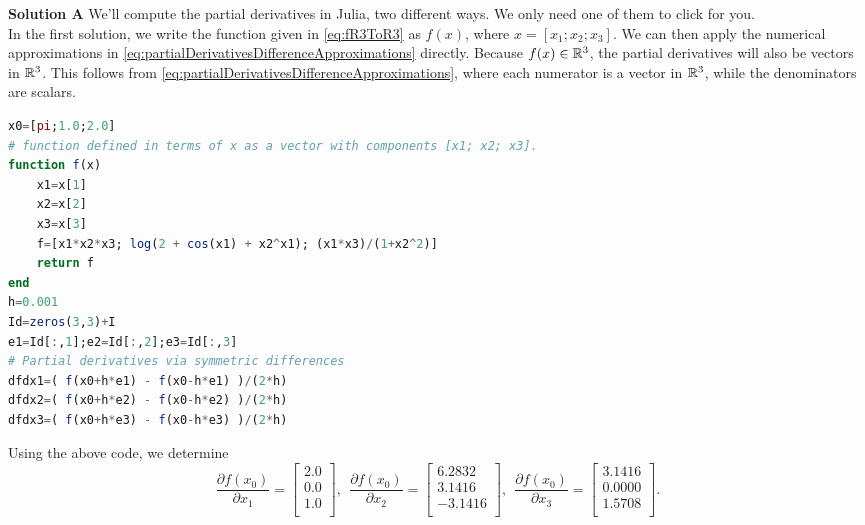  \textbf{Solution A} We'll compute the partial derivatives in Julia, two different ways. We only need one of them to click for you. \\
 
 In the first solution, we write the function given in \eqref{eq:fR3ToR3} as $f(x)$, where $x=[x_1; x_2; x_3]$. We can then apply the numerical approximations in \eqref{eq:partialDerivativesDifferenceApproximations} directly. Because $f(x) \in \mathbb R^3$, the partial derivatives will also be vectors in $\mathbb R^3$. This follows from \eqref{eq:partialDerivativesDifferenceApproximations}, where each numerator is a  vector in $\mathbb R^3$, while the denominators are scalars.
 
 \begin{lstlisting}[language=Julia,style=mystyle]
x0=[pi;1.0;2.0]
# function defined in terms of x as a vector with components [x1; x2; x3].
function f(x)
    x1=x[1]
    x2=x[2]
    x3=x[3]
    f=[x1*x2*x3; log(2 + cos(x1) + x2^x1); (x1*x3)/(1+x2^2)]
    return f
end
h=0.001
Id=zeros(3,3)+I
e1=Id[:,1];e2=Id[:,2];e3=Id[:,3]
# Partial derivatives via symmetric differences
dfdx1=( f(x0+h*e1) - f(x0-h*e1) )/(2*h)
dfdx2=( f(x0+h*e2) - f(x0-h*e2) )/(2*h)
dfdx3=( f(x0+h*e3) - f(x0-h*e3) )/(2*h)

 \end{lstlisting}
Using the above code, we determine
  \begin{equation}
  \label{eq:PartialDerivativeAnswers}
\frac{\partial f(x_0)}{\partial x_1} = \left[
\begin{array}{c}
2.0 \\
0.0 \\
1.0 \\
\end{array}
\right], ~~\frac{\partial f(x_0)}{\partial x_2} = \left[
\begin{array}{r}
6.2832 \\
3.1416 \\
-3.1416 \\
\end{array}
\right],~~ \frac{\partial f(x_0)}{\partial x_3} = 
\left[
\begin{array}{c}
3.1416 \\
0.0000 \\
1.5708 \\
\end{array}
\right].
\end{equation}
\Qed

\vspace*{0.5cm}

